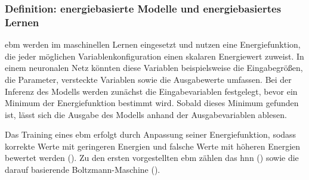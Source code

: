 \subsubsection{Definition: energiebasierte Modelle und energiebasiertes Lernen}

\ac{ebm} werden im maschinellen Lernen eingesetzt und nutzen eine Energiefunktion, die jeder möglichen Variablenkonfiguration einen skalaren Energiewert zuweist. In einem neuronalen Netz könnten diese Variablen beispielsweise die Eingabegrößen, die Parameter, versteckte Variablen sowie die Ausgabewerte umfassen. Bei der Inferenz des Modells werden zunächst die Eingabevariablen festgelegt, bevor ein Minimum der Energiefunktion bestimmt wird. Sobald dieses Minimum gefunden ist, lässt sich die Ausgabe des Modells anhand der Ausgabevariablen ablesen.

Das Training eines \ac{ebm} erfolgt durch Anpassung seiner Energiefunktion, sodass korrekte Werte mit geringeren Energien und falsche Werte mit höheren Energien bewertet werden (\cite{Lecun2006}). Zu den ersten vorgestellten \ac{ebm} zählen das \ac{hnn} (\cite{Hopfield1984}) sowie die darauf basierende Boltzmann-Maschine (\cite{Ackley1985}).
